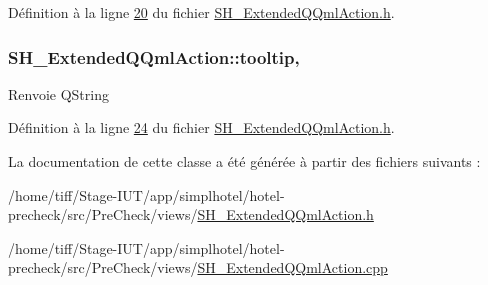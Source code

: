 Définition à la ligne \hyperlink{SH__ExtendedQQmlAction_8h_source_l00020}{20} du fichier \hyperlink{SH__ExtendedQQmlAction_8h_source}{S\-H\-\_\-\-Extended\-Q\-Qml\-Action.\-h}.

\hypertarget{classSH__ExtendedQQmlAction_a09728d442bc94953fc35e0eb9ece89c1}{
\subsubsection[{tooltip}]{\setlength{\rightskip}{0pt plus 5cm}S\-H\-\_\-\-Extended\-Q\-Qml\-Action\-::tooltip\hspace{0.3cm}{\ttfamily [read]}, {\ttfamily [write]}}}\label{classSH__ExtendedQQmlAction_a09728d442bc94953fc35e0eb9ece89c1}
\begin{DoxyReturn}{Renvoie}
Q\-String 
\end{DoxyReturn}


Définition à la ligne \hyperlink{SH__ExtendedQQmlAction_8h_source_l00024}{24} du fichier \hyperlink{SH__ExtendedQQmlAction_8h_source}{S\-H\-\_\-\-Extended\-Q\-Qml\-Action.\-h}.



La documentation de cette classe a été générée à partir des fichiers suivants \-:\begin{DoxyCompactItemize}
\item 
/home/tiff/\-Stage-\/\-I\-U\-T/app/simplhotel/hotel-\/precheck/src/\-Pre\-Check/views/\hyperlink{SH__ExtendedQQmlAction_8h}{S\-H\-\_\-\-Extended\-Q\-Qml\-Action.\-h}\item 
/home/tiff/\-Stage-\/\-I\-U\-T/app/simplhotel/hotel-\/precheck/src/\-Pre\-Check/views/\hyperlink{SH__ExtendedQQmlAction_8cpp}{S\-H\-\_\-\-Extended\-Q\-Qml\-Action.\-cpp}\end{DoxyCompactItemize}
